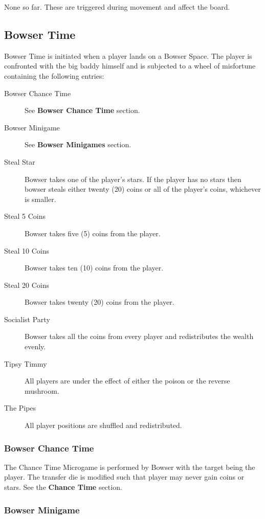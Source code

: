 \documentclass{article}
\begin{document}
None so far. These are triggered during movement and affect the board.

\subsection{Bowser Time}

Bowser Time is initiated when a player lands on a Bowser Space.  The player
is confronted with the big baddy himself and is subjected to a wheel of
misfortune containing the following entries:

\begin{description}
\item[Bowser Chance Time] See \textbf{Bowser Chance Time} section.
\item[Bowser Minigame] See \textbf{Bowser Minigames} section.

\item[Steal Star] Bowser takes one of the player's stars.  If the player has no
stars then bowser steals either twenty (20) coins or all of the player's coins,
whichever is smaller.

\item[Steal 5 Coins] Bowser takes five (5) coins from the player.
\item[Steal 10 Coins] Bowser takes ten (10) coins from the player.
\item[Steal 20 Coins] Bowser takes twenty (20) coins from the player.

\item[Socialist Party] Bowser takes all the coins from every player and
redistributes the wealth evenly.

\item[Tipsy Timmy] All players are under the effect of either the
poison or the reverse mushroom.

\item[The Pipes] All player positions are shuffled and redistributed.
\end{description}

\subsubsection{Bowser Chance Time}

The Chance Time Microgame is performed by Bowser with the target being the player.
The transfer die is modified such that player may never gain coins or stars.
See the \textbf{Chance Time} section.

\subsubsection{Bowser Minigame}
\end{document}
